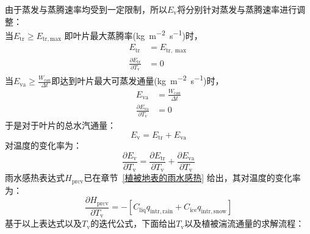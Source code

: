 由于蒸发与蒸腾速率均受到一定限制，所以$E_{\mathrm{v}}$将分别针对蒸发与蒸腾速率进行调整：\\
当$ E_{\mathrm{tr}} \geqslant E_{\mathrm{tr,max}}$ 即叶片最大蒸腾率(\unit{kg.m^{-2}.s^{-1}})时，
\begin{equation}
  \begin{aligned}
    E_{\mathrm{tr}} &=  E_{\mathrm{tr, \max }} \\[1ex]
    \frac{\partial E_{\mathrm{tr}}}{\partial T_{\mathrm{v}}} &= 0
  \end{aligned}
\end{equation}
当$E_{\mathrm{va}} \geqslant \frac{W_{\mathrm{can}}}{\Delta t}$即达到叶片最大可蒸发通量(\unit{kg.m^{-2}.s^{-1}})时，
\begin{equation}
  \begin{aligned}
    E_{\mathrm{va}} &= \frac{W_{\mathrm{can}}}{\Delta t} \\[1ex]
    \frac{\partial E_{\mathrm{va}}}{\partial T_{\mathrm{v}}} &= 0
  \end{aligned}
\end{equation}
于是对于叶片的总水汽通量：
\begin{equation}
  E_{\mathrm{v}} = E_{\mathrm{tr}}+E_{\mathrm{va}}
\end{equation}
对温度的变化率为：
\begin{equation}
  \frac{\partial E_{\mathrm{v}}}{\partial T_{\mathrm{v}}} = \frac{\partial E_{\mathrm{tr}}}{\partial T_{\mathrm{v}}}+\frac{\partial E_{\mathrm{va}}}{\partial T_{\mathrm{v}}}
\end{equation}
雨水感热表达式$H_{\mathrm{prcv}}$已在章节~\ref{植被地表的雨水感热} 给出，其对温度的变化率为：
\begin{equation}
  \frac{\partial H_{\mathrm{prcv}}}{\partial T_{\mathrm{v}}}=-\left[C_{\mathrm{liq}} q_{\mathrm{intr,rain}}+C_{\mathrm{ice}} q_{\mathrm{intr,snow}}\right]
\end{equation}
基于以上表达式以及$T_{\mathrm v}$的迭代公式，下面给出$T_{\mathrm v}$以及植被湍流通量的求解流程：

